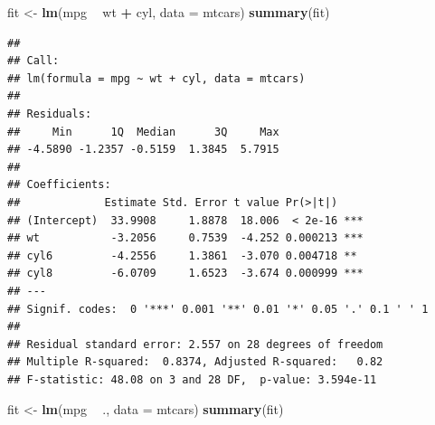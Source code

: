 \documentclass[
  12pt,
]{book}
\newenvironment{Shaded}{\begin{snugshade}}{\end{snugshade}}
\newcommand{\DataTypeTok}[1]{\textcolor[rgb]{0.13,0.29,0.53}{#1}}
\newcommand{\KeywordTok}[1]{\textcolor[rgb]{0.13,0.29,0.53}{\textbf{#1}}}
\newcommand{\NormalTok}[1]{#1}
\newcommand{\OperatorTok}[1]{\textcolor[rgb]{0.81,0.36,0.00}{\textbf{#1}}}
\newcommand{\StringTok}[1]{\textcolor[rgb]{0.31,0.60,0.02}{#1}}
\theoremstyle{definition}
\theoremstyle{definition}
\theoremstyle{definition}
\theoremstyle{remark}
\begin{document}
\begin{Shaded}
\begin{Highlighting}[]
\NormalTok{fit <-}\StringTok{ }\KeywordTok{lm}\NormalTok{(mpg }\OperatorTok{~}\StringTok{ }\NormalTok{wt }\OperatorTok{+}\StringTok{ }\NormalTok{cyl, }\DataTypeTok{data =}\NormalTok{ mtcars)}
\KeywordTok{summary}\NormalTok{(fit)}
\end{Highlighting}
\end{Shaded}

\begin{verbatim}
## 
## Call:
## lm(formula = mpg ~ wt + cyl, data = mtcars)
## 
## Residuals:
##     Min      1Q  Median      3Q     Max 
## -4.5890 -1.2357 -0.5159  1.3845  5.7915 
## 
## Coefficients:
##             Estimate Std. Error t value Pr(>|t|)    
## (Intercept)  33.9908     1.8878  18.006  < 2e-16 ***
## wt           -3.2056     0.7539  -4.252 0.000213 ***
## cyl6         -4.2556     1.3861  -3.070 0.004718 ** 
## cyl8         -6.0709     1.6523  -3.674 0.000999 ***
## ---
## Signif. codes:  0 '***' 0.001 '**' 0.01 '*' 0.05 '.' 0.1 ' ' 1
## 
## Residual standard error: 2.557 on 28 degrees of freedom
## Multiple R-squared:  0.8374, Adjusted R-squared:   0.82 
## F-statistic: 48.08 on 3 and 28 DF,  p-value: 3.594e-11
\end{verbatim}

\begin{Shaded}
\begin{Highlighting}[]
\NormalTok{fit <-}\StringTok{ }\KeywordTok{lm}\NormalTok{(mpg }\OperatorTok{~}\StringTok{ }\NormalTok{., }\DataTypeTok{data =}\NormalTok{ mtcars)}
\KeywordTok{summary}\NormalTok{(fit)}
\end{Highlighting}
\end{Shaded}
\end{document}
